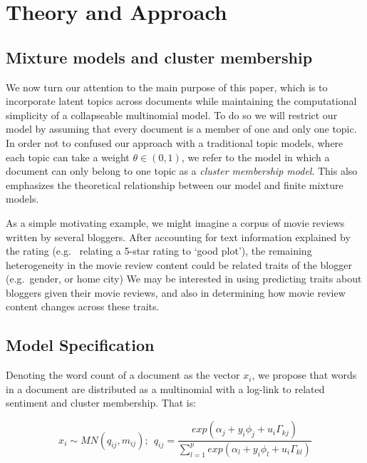 \documentclass[12pt]{article}
\begin{document}
\section{Theory and Approach}\label{theory-and-approach}

\subsection{Mixture models and cluster
membership}\label{mixture-models-and-cluster-membership}

We now turn our attention to the main purpose of this paper, which is to
incorporate latent topics across documents while maintaining the computational simplicity of a collapseable multinomial model. To do so we will restrict our model by assuming that every document is a member of one and only one topic. In order not to confused our approach with a traditional topic models, where each topic can take a weight $\theta \in (0,1)$, we refer to the model in which a document can only belong to one topic as a \textit{cluster membership model}. This also emphasizes the theoretical relationship between our model and finite mixture models. 

As a simple motivating example, we might imagine a corpus of
movie reviews written by several bloggers. After accounting for text
information explained by the rating (e.g. ~relating a 5-star rating to
`good plot'), the remaining heterogeneity in the movie review
content could be related traits of the blogger (e.g.~gender, or home
city) We may be interested in using predicting traits about bloggers
given their movie reviews, and also in determining how movie review
content changes across these traits.




\subsection{Model Specification}\label{model-specification}

Denoting the word count of a document as the vector $x_i$, we propose
that words in a document are distributed as a multinomial with a
log-link to related sentiment and cluster membership. That is:

\begin{equation}
 x_{i} \sim MN(q_{ij},m_{ij})    ; ~~  q_{ij} = \frac{exp(\alpha_j + y_i \phi_j + u_i \Gamma_{kj})}{\sum_{l=1}^{p}{exp(\alpha_l+ y_i \phi_l + u_i \Gamma_{kl})}}
\end{equation} 
\end{document}
